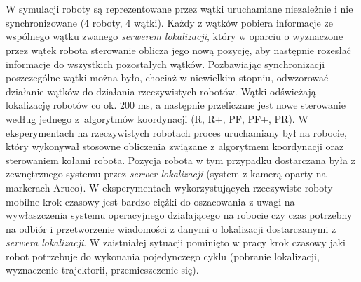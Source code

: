 \section*{}
\begin{frame}
\frametitle{\secname}
\scriptsize

W symulacji roboty są reprezentowane przez wątki uruchamiane niezależnie i nie synchronizowane (4 roboty, 4 wątki). Każdy z wątków pobiera informacje ze wspólnego wątku zwanego \textit{serwerem lokalizacji}, który w oparciu o wyznaczone przez wątek robota sterowanie oblicza jego nową pozycję, aby następnie rozesłać informacje do wszystkich pozostałych wątków. Pozbawiając synchronizacji poszczególne wątki można było, chociaż w niewielkim stopniu, odwzorować działanie wątków do działania rzeczywistych robotów. Wątki odświeżają lokalizację robotów co ok. 200 ms, a następnie przeliczane jest nowe sterowanie według jednego z~algorytmów koordynacji (R, R+, PF, PF+, PR).
\newline
\newline
W eksperymentach na rzeczywistych robotach proces uruchamiany był na robocie, który wykonywał stosowne obliczenia związane z algorytmem koordynacji oraz sterowaniem kołami robota. Pozycja robota w tym przypadku dostarczana była z zewnętrznego systemu przez \textit{serwer lokalizacji} (system z kamerą oparty na markerach Aruco). W eksperymentach wykorzystujących rzeczywiste roboty mobilne krok czasowy jest bardzo ciężki do oszacowania z uwagi na wywłaszczenia systemu operacyjnego działającego na robocie czy czas potrzebny na odbiór i przetworzenie wiadomości z danymi o lokalizacji dostarczanymi z \textit{serwera lokalizacji}. W zaistniałej sytuacji pominięto w pracy krok czasowy jaki robot potrzebuje do wykonania pojedynczego cyklu (pobranie lokalizacji,  wyznaczenie trajektorii, przemieszczenie się). 


\end{frame}
